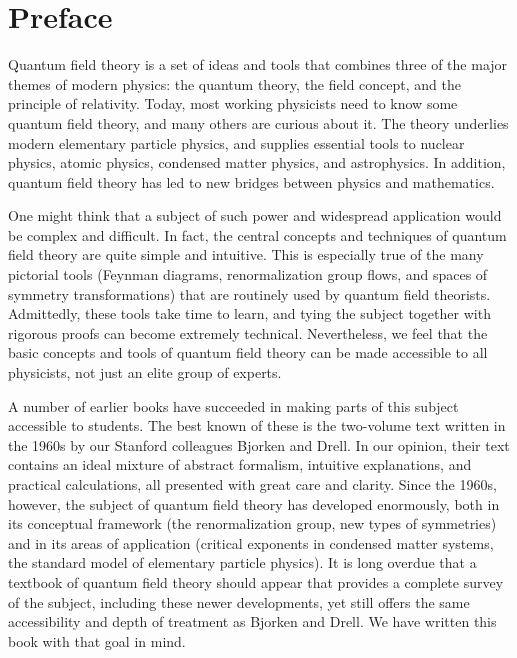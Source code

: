 \chapter*{Preface}

Quantum field theory is a set of ideas and tools that combines three of the
major themes of modern physics: the quantum theory, the field concept, and
the principle of relativity.  Today, most working physicists need to know some
quantum field theory, and many others are curious about it.  The theory
underlies modern elementary particle physics, and supplies essential tools to
nuclear physics, atomic physics, condensed matter physics, and astrophysics.
In addition, quantum field theory has led to new bridges between physics and
mathematics.

One might think that a subject of such power and widespread application
would be complex and difficult.  In fact, the central concepts and techniques
of quantum field theory are quite simple and intuitive.  This is especially
true of the many pictorial tools (Feynman diagrams, renormalization group
flows, and spaces of symmetry transformations) that are routinely used by
quantum field theorists.  Admittedly, these tools take time to learn, and
tying the subject together with rigorous proofs can become extremely
technical.  Nevertheless, we feel that the basic concepts and tools of
quantum field theory can be made accessible to all physicists, not just an
elite group of experts.

A number of earlier books have succeeded in making parts of this subject
accessible to students.  The best known of these is the two-volume text
written in the 1960s by our Stanford colleagues Bjorken and Drell.  In our
opinion, their text contains an ideal mixture of abstract formalism,
intuitive explanations, and practical calculations, all presented with great
care and clarity.  Since the 1960s, however, the subject of quantum field
theory has developed enormously, both in its conceptual framework (the
renormalization group, new types of symmetries) and in its areas of
application (critical exponents in condensed matter systems, the standard
model of elementary particle physics).  It is long overdue that a textbook
of quantum field theory should appear that provides a complete survey of
the subject, including these newer developments, yet still offers the same
accessibility and depth of treatment as Bjorken and Drell.  We have written
this book with that goal in mind.

